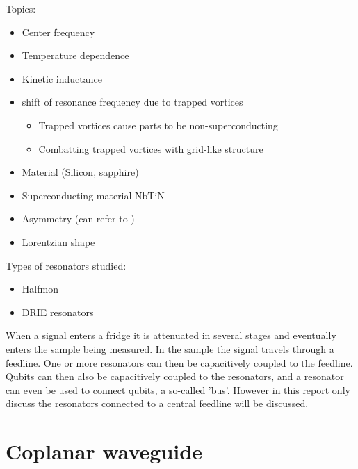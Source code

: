 \documentclass[12pt]{report}
\begin{document}

Topics:
\begin{itemize}
    \item Center frequency
    \item Temperature dependence
    \item Kinetic inductance
    \item shift of resonance frequency due to trapped vortices
    \begin{itemize}
        \item Trapped vortices cause parts to be non-superconducting
        \item Combatting trapped vortices with grid-like structure
    \end{itemize}
    \item Material (Silicon, sapphire)
    \item Superconducting material NbTiN
    \item Asymmetry (can refer to \cite[p.~192]{Geerlings})
    \item Lorentzian shape
\end{itemize}

Types of resonators studied:
\begin{itemize}
    \item Halfmon
    \item DRIE resonators
\end{itemize}


When a signal enters a fridge it is attenuated in several stages and eventually enters the sample being measured. In the sample the signal travels through a feedline. One or more resonators can then be capacitively coupled to the feedline. Qubits can then also be capacitively coupled to the resonators, and a resonator can even be used to connect qubits, a so-called 'bus'. However in this report only discuss the resonators connected to a central feedline will be discussed.









\section{Coplanar waveguide}
\end{document}
